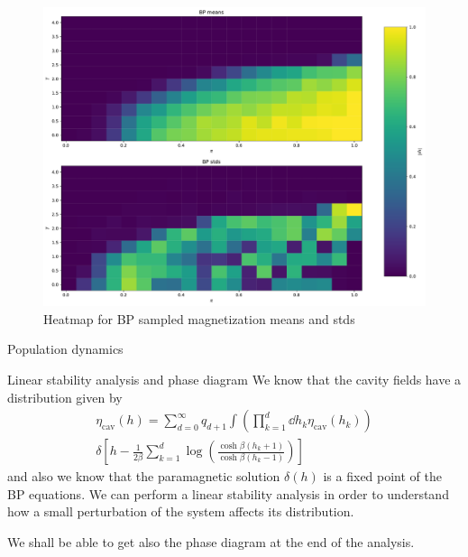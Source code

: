 \documentclass[handout]{beamer}
\begin{document}
\begin{frame}[plain]
    \begin{figure}
        \centering
        \includegraphics[width=.8\textwidth]{bp_heatmap}
        \caption{Heatmap for BP sampled magnetization means and stds}
        \label{fig:bp_heatmap}
    \end{figure}
\end{frame}

\begin{frame}{Population dynamics}
\end{frame}

\begin{frame}{Linear stability analysis and phase diagram}
    We know that the cavity fields have a distribution given by
    \begin{multline}
        \eta_{\text{cav}}(h) =
        \sum_{d=0}^{\infty} q_{d+1}
        \int \left( \prod_{k=1}^d \dd{h_k} \eta_{\text{cav}} (h_k) \right) \\
        \delta \left[ h - \frac{1}{2\beta} \sum_{k=1}^d
            \log\left( \frac{\cosh{\beta(h_k+1)}}{\cosh{\beta(h_k-1)}} \right)
        \right]
        \label{eq:cav_field_distrib}
    \end{multline}
    and also we know that the paramagnetic solution $\delta(h)$ is a
    \alert{fixed point} of the BP equations. We can perform a \alert{linear
    stability analysis} in order to understand how a small perturbation of the
    system affects its distribution.

    We shall be able to get also the phase diagram at the end of the analysis.
\end{frame}
\end{document}
